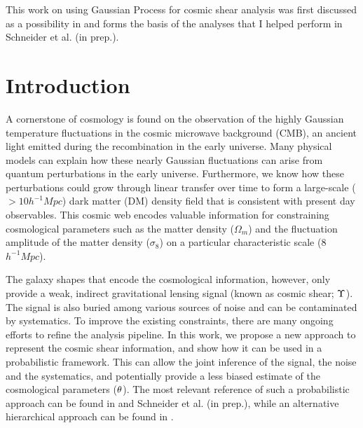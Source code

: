  
This work on using Gaussian Process for cosmic shear analysis 
was first discussed as a possibility in  \citep{Schneider2014}  and 
forms the basis of the analyses that I helped perform 
in Schneider et al. (in prep.). 

\section{Introduction} 

A cornerstone of cosmology is found on the 
observation of the highly Gaussian temperature fluctuations in the cosmic microwave 
background (CMB), an ancient light emitted during the recombination in the early
universe. Many physical models can explain how these
nearly Gaussian fluctuations can arise from quantum perturbations in the 
early universe. Furthermore, we know how these perturbations could grow
through linear transfer over time to form a large-scale ($> 10 h^{-1} Mpc$) 
dark matter (DM) density field that is consistent with present
day observables. 
This cosmic web encodes valuable information for constraining cosmological
parameters such as the matter density ($\Omega_m$) and the fluctuation amplitude 
of the matter density ($\sigma_8$) on a particular characteristic scale (8
$h^{-1} Mpc$).


The galaxy shapes that encode the cosmological information, 
however, only provide a weak, indirect gravitational lensing signal (known as cosmic
shear; $\Upsilon$). The signal is also buried among various sources of noise
and can be contaminated by systematics. 
To improve the existing constraints, there are many ongoing 
efforts to refine the analysis pipeline. 
In this work, we propose a new approach to represent the cosmic shear information, 
and show how it can be used in a probabilistic framework. 
This can allow the joint inference of the signal, the noise and the systematics, 
and potentially provide a less biased estimate of the cosmological parameters (${\bf \theta}$). 
The most relevant reference of such a probabilistic approach can be found in 
\cite{Schneider2014} and Schneider et al. (in prep.), 
while an alternative hierarchical approach can be found in \cite{Alsing2015}. 

